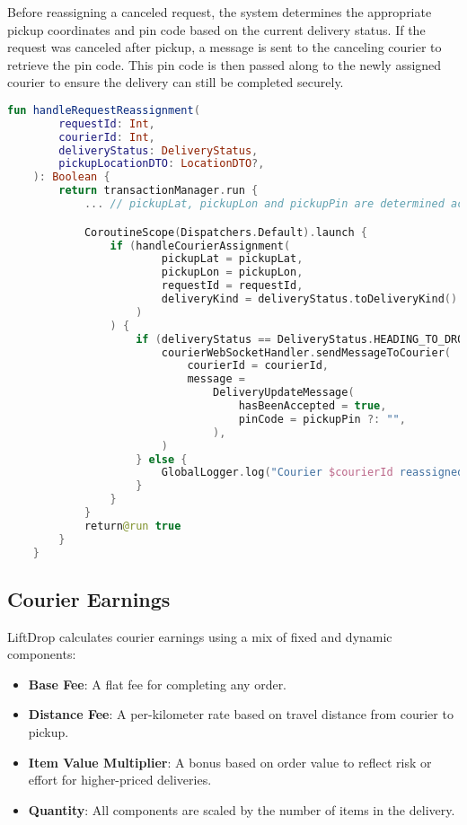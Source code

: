 \newpage

Before reassigning a canceled request, the system determines the appropriate pickup coordinates and pin code based on the current delivery status. If the request was canceled after pickup, a message is sent to the canceling courier to retrieve the pin code. This pin code is then passed along to the newly assigned courier to ensure the delivery can still be completed securely.

\begin{lstlisting}[language=Kotlin, caption={Reassignment of a cancelled request}]
fun handleRequestReassignment(
        requestId: Int,
        courierId: Int,
        deliveryStatus: DeliveryStatus,
        pickupLocationDTO: LocationDTO?,
    ): Boolean {
        return transactionManager.run {
            ... // pickupLat, pickupLon and pickupPin are determined according to the delivery status

            CoroutineScope(Dispatchers.Default).launch {
                if (handleCourierAssignment(
                        pickupLat = pickupLat,
                        pickupLon = pickupLon,
                        requestId = requestId,
                        deliveryKind = deliveryStatus.toDeliveryKind().name,
                    )
                ) {
                    if (deliveryStatus == DeliveryStatus.HEADING_TO_DROPOFF) {
                        courierWebSocketHandler.sendMessageToCourier(
                            courierId = courierId,
                            message =
                                DeliveryUpdateMessage(
                                    hasBeenAccepted = true,
                                    pinCode = pickupPin ?: "",
                                ),
                        )
                    } else {
                        GlobalLogger.log("Courier $courierId reassigned to request $requestId")
                    }
                }
            }
            return@run true
        }
    }
\end{lstlisting}


\subsection{Courier Earnings}

LiftDrop calculates courier earnings using a mix of fixed and dynamic components:

\begin{itemize}
    \item \textbf{Base Fee}: A flat fee for completing any order.
    \item \textbf{Distance Fee}: A per-kilometer rate based on travel distance from courier to pickup.
    \item \textbf{Item Value Multiplier}: A bonus based on order value to reflect risk or effort for higher-priced deliveries.
    \item \textbf{Quantity}: All components are scaled by the number of items in the delivery.
\end{itemize}

